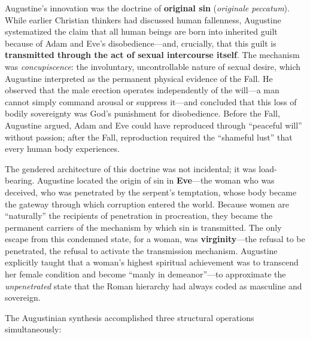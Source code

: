\documentclass[12pt,openany]{book}
\begin{document}
Augustine's innovation was the doctrine of \textbf{original sin} (\textit{originale peccatum}). While earlier Christian thinkers had discussed human fallenness, Augustine systematized the claim that all human beings are born into inherited guilt because of Adam and Eve's disobedience---and, crucially, that this guilt is \textbf{transmitted through the act of sexual intercourse itself}. The mechanism was \textit{concupiscence}: the involuntary, uncontrollable nature of sexual desire, which Augustine interpreted as the permanent physical evidence of the Fall. He observed that the male erection operates independently of the will---a man cannot simply command arousal or suppress it---and concluded that this loss of bodily sovereignty was God's punishment for disobedience. Before the Fall, Augustine argued, Adam and Eve could have reproduced through ``peaceful will'' without passion; after the Fall, reproduction required the ``shameful lust'' that every human body experiences.

The gendered architecture of this doctrine was not incidental; it was load-bearing. Augustine located the origin of sin in \textbf{Eve}---the woman who was deceived, who was penetrated by the serpent's temptation, whose body became the gateway through which corruption entered the world. Because women are ``naturally'' the recipients of penetration in procreation, they became the permanent carriers of the mechanism by which sin is transmitted. The only escape from this condemned state, for a woman, was \textbf{virginity}---the refusal to be penetrated, the refusal to activate the transmission mechanism. Augustine explicitly taught that a woman's highest spiritual achievement was to transcend her female condition and become ``manly in demeanor''---to approximate the \textit{unpenetrated} state that the Roman hierarchy had always coded as masculine and sovereign.

The Augustinian synthesis accomplished three structural operations simultaneously:
\end{document}
